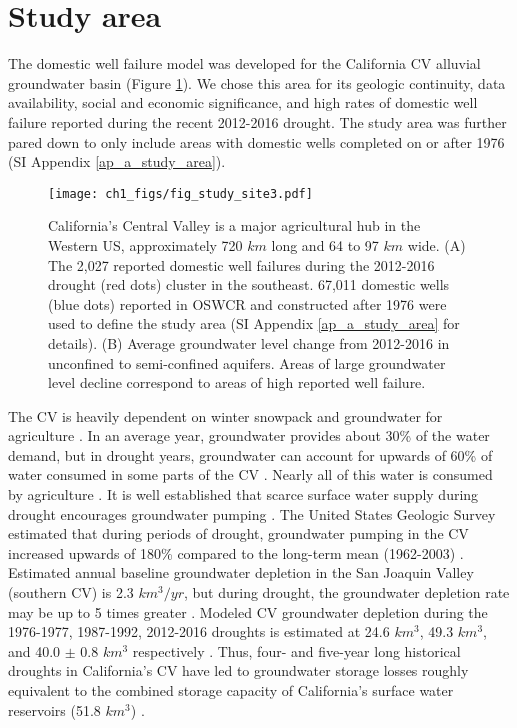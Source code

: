 \section{Study area}

The domestic well failure model was developed for the California CV alluvial groundwater basin (Figure \ref{fig:study_site}). We chose this area for its geologic continuity, data availability, social and economic significance, and high rates of domestic well failure reported during the recent 2012-2016 drought. The study area was further pared down to only include areas with domestic wells completed on or after 1976 (SI Appendix \ref{ap_a_study_area}).  

\begin{figure}%
	\centering
	\texttt{[image: ch1\_figs/fig\_study\_site3.pdf]}
	\caption{California's Central Valley is a major agricultural hub in the Western US, approximately 720 $km$ long and 64 to 97 $km$ wide. (A) The 2,027 reported domestic well failures during the 2012-2016 drought (red dots) cluster in the southeast. 67,011 domestic wells (blue dots) reported in OSWCR and constructed after 1976 were used to define the study area (SI Appendix \ref{ap_a_study_area} for details). (B) Average groundwater level change from 2012-2016 in unconfined to semi-confined aquifers. Areas of large groundwater level decline correspond to areas of high reported well failure.}
	\label{fig:study_site}
\end{figure}

The CV is heavily dependent on winter snowpack and groundwater for agriculture \citep{Scanlon2012, Faunted.2009, Hanak2011}. 
In an average year, groundwater provides about 30\% of the water demand, but in drought years, groundwater can account for upwards of 60\% of water consumed in some parts of the CV \citep{Brush2013}. Nearly all of this water is consumed by agriculture \citep{Brush2013, Faunted.2009}. 
It is well established that scarce surface water supply during drought encourages groundwater pumping \citep{Lund2018, Feinstein2017, Mount2018}. The United States Geologic Survey estimated that during periods of drought, groundwater pumping in the CV increased upwards of 180\% compared to the long-term mean (1962-2003) \citep{Faunted.2009}. 
Estimated annual baseline groundwater depletion in the San Joaquin Valley (southern CV) is 2.3 $km^3/yr$, but during drought, the groundwater depletion rate may be up to 5 times greater \citep{Hanak2019}. 
Modeled CV groundwater depletion during the 1976-1977, 1987-1992, 2012-2016 droughts is estimated at 24.6 $km^3$, 49.3 $km^3$, and 40.0 $\pm$ 0.8 $km^3$ respectively \citep{Scanlon2012, Xiao2017}.
Thus, four- and five-year long historical droughts in California's CV have led to groundwater storage losses roughly equivalent to the combined storage capacity of California's surface water reservoirs (51.8 $km^3$) \citep{Hanak2011}.  

